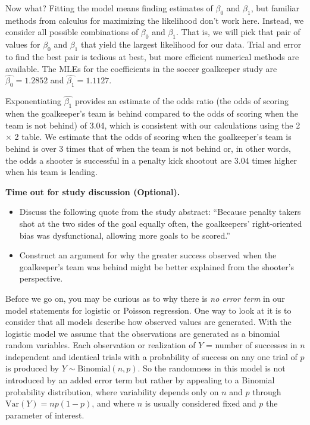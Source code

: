 \documentclass[
]{krantz}
\begin{document}
Now what? Fitting the model means finding estimates of \(\beta_0\) and \(\beta_1\), but familiar methods from calculus for maximizing the likelihood don't work here. Instead, we consider all possible combinations of \(\beta_0\) and \(\beta_1\). That is, we will pick that pair of values for \(\beta_0\) and \(\beta_1\) that yield the largest likelihood for our data. Trial and error to find the best pair is tedious at best, but more efficient numerical methods are available. The MLEs for the coefficients in the soccer goalkeeper study are \(\hat{\beta_0}= 1.2852\) and \(\hat{\beta_1}=1.1127\).

Exponentiating \(\hat{\beta_1}\) provides an estimate of the odds ratio (the odds of scoring when the goalkeeper's team is behind compared to the odds of scoring when the team is not behind) of 3.04, which is consistent with our calculations using the 2 \(\times\) 2 table. We estimate that the odds of scoring when the goalkeeper's team is behind is over 3 times that of when the team is not behind or, in other words, the odds a shooter is successful in a penalty kick shootout are 3.04 times higher when his team is leading.
\vspace{5mm}

\textbf{Time out for study discussion (Optional).}

\begin{itemize}
\item
  Discuss the following quote from the study abstract: ``Because penalty takers shot at the two sides of the goal equally often, the goalkeepers' right-oriented bias was dysfunctional, allowing more goals to be scored.''
\item
  Construct an argument for why the greater success observed when the goalkeeper's team was behind might be better explained from the shooter's perspective.
\end{itemize}

Before we go on, you may be curious as to why there is \emph{no error term} in our model statements for logistic or Poisson regression. One way to look at it is to consider that all models describe how observed values are generated. With the logistic model we assume that the observations are generated as a binomial random variables. Each observation or realization of \(Y\) = number of successes in \(n\) independent and identical trials with a probability of success on any one trial of \(p\) is produced by \(Y \sim \textrm{Binomial}(n,p)\). So the randomness in this model is not introduced by an added error term but rather by appealing to a Binomial probability distribution, where variability depends only on \(n\) and \(p\) through \(\textrm{Var}(Y)=np(1-p)\), and where \(n\) is usually considered fixed and \(p\) the parameter of interest.
\end{document}

